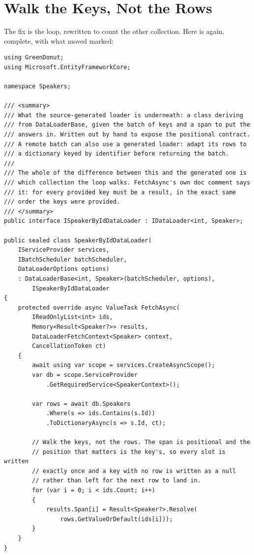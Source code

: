 \section{Walk the Keys, Not the Rows}
\label{sec:ch11-walk-the-keys-not-the-rows}

%
The fix is the loop, rewritten to count the other collection. Here is
 again, complete, with what moved marked:

\begin{verbatim}
using GreenDonut;
using Microsoft.EntityFrameworkCore;

namespace Speakers;

/// <summary>
/// What the source-generated loader is underneath: a class deriving
/// from DataLoaderBase, given the batch of keys and a span to put the
/// answers in. Written out by hand to expose the positional contract.
/// A remote batch can also use a generated loader: adapt its rows to
/// a dictionary keyed by identifier before returning the batch.
///
/// The whole of the difference between this and the generated one is
/// which collection the loop walks. FetchAsync's own doc comment says
/// it: for every provided key must be a result, in the exact same
/// order the keys were provided.
/// </summary>
public interface ISpeakerByIdDataLoader : IDataLoader<int, Speaker>;

public sealed class SpeakerByIdDataLoader(
    IServiceProvider services,
    IBatchScheduler batchScheduler,
    DataLoaderOptions options)
    : DataLoaderBase<int, Speaker>(batchScheduler, options),
        ISpeakerByIdDataLoader
{
    protected override async ValueTask FetchAsync(
        IReadOnlyList<int> ids,
        Memory<Result<Speaker?>> results,
        DataLoaderFetchContext<Speaker> context,
        CancellationToken ct)
    {
        await using var scope = services.CreateAsyncScope();
        var db = scope.ServiceProvider
            .GetRequiredService<SpeakerContext>();

        var rows = await db.Speakers
            .Where(s => ids.Contains(s.Id))
            .ToDictionaryAsync(s => s.Id, ct);

        // Walk the keys, not the rows. The span is positional and the
        // position that matters is the key's, so every slot is written
        // exactly once and a key with no row is written as a null
        // rather than left for the next row to land in.
        for (var i = 0; i < ids.Count; i++)
        {
            results.Span[i] = Result<Speaker?>.Resolve(
                rows.GetValueOrDefault(ids[i]));
        }
    }
}
\end{verbatim}

